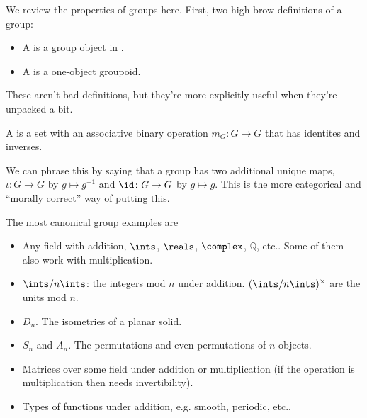\documentclass[11pt]{article}
\begin{document}
We review the properties of groups here. First, two high-brow definitions of a
group:
\begin{itemize}
    \item A  is a group object in .
    \item A  is a one-object groupoid.
\end{itemize}
These aren't bad definitions, but they're more explicitly useful when they're
unpacked a bit.
\begin{definition}
    A  is a set with an associative binary operation
    $m_G \colon G \to G$ that has identites and inverses.
\end{definition}
We can phrase this by saying that a group has two additional unique maps,
$\iota \colon G \to G$ by $g \mapsto g^{-1}$ and $\id \colon G \to G$
by $g \mapsto g$. This is the more categorical and ``morally correct''
way of putting this.
\begin{eexample}
    The most canonical group examples are
    \begin{itemize}
        \item Any field with addition, $\ints$, $\reals$, $\complex$, $\mathbb{Q}$,
        etc.. Some of them also work with multiplication.
        \item $\ints/n\ints$: the integers mod $n$ under addition. $(\ints/n\ints)^\times$
        are the units mod $n$.
        \item $D_n$. The isometries of a planar solid.
        \item $S_n$ and $A_n$. The permutations and even permutations of $n$ objects.
        \item Matrices over some field under addition or multiplication (if the operation
        is multiplication then needs invertibility).
        \item Types of functions under addition, e.g. smooth, periodic, etc..
    \end{itemize}
\end{eexample}
\end{document}
